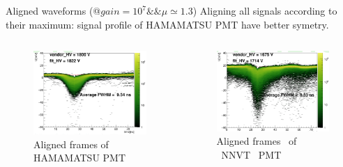 \begin{frame}{Aligned waveforms (@$gain=10^7\&\&\mu\simeq 1.3$)}
Aligning all signals according to their maximum: signal profile of HAMAMATSU PMT have better symetry.
\begin{columns}
\begin{column}{.5\textwidth}
\begin{figure}
\centering
\includegraphics[width=\textwidth]{figures/hamaligned2d.png} %
\caption{Aligned frames of HAMAMATSU PMT}
\end{figure}
\end{column}
\begin{column}{.5\textwidth}
\begin{figure}
\centering
\includegraphics[width=\textwidth]{figures/mcpaligned2d.png} %
\caption{Aligned frames \ of \ NNVT \ PMT}
\end{figure}
\end{column}
\end{columns}
\end{frame}
